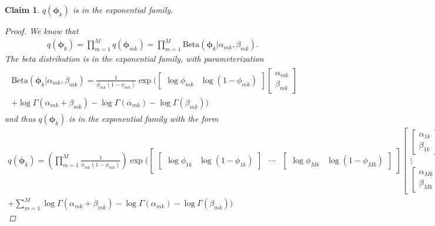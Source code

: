 \documentclass[11pt]{article}
\newtheorem{claim}{Claim}
\begin{document}
\begin{appendices}
\begin{claim}
$q(\bm{\phi}_k)$ is in the exponential family.
\begin{proof}
We know that
\begin{align*}
q(\bm{\phi}_k)  = \prod\limits_{m=1}^M q(\bm{\phi}_{mk}) = \prod\limits_{m=1}^M \mathrm{Beta}(\bm{\phi}_k | \alpha_{mk}, \beta_{mk}).
\end{align*}
The beta distribution is in the exponential family, with parameterization 
\begin{align}
\begin{split}
\mathrm{Beta}(\bm{\phi}_k |  \alpha_{mk}, \beta_{mk}) =  \frac{1}{\phi_{mk}(1 - \phi_{mk})} \exp \bigg(
		\begin{bmatrix}
			\log\phi_{mk} & \log(1 - \phi_{mk})
		\end{bmatrix}
		\begin{bmatrix}
			\alpha_{mk} \\ \beta_{mk}
		\end{bmatrix} \\
+ \log \Gamma(\alpha_{mk} + \beta_{mk}) - \log \Gamma(\alpha_{mk}) - \log\Gamma(\beta_{mk}) \bigg)
\end{split}
\end{align}
and thus $q(\bm{\phi}_k)$ is in the exponential family with the form
\begin{align*}
q(\bm{\phi}_k) = \left(\prod\limits_{m=1}^M \frac{1}{\phi_{mk}(1 - \phi_{mk})} \right) \exp\bigg(
			\begin{bmatrix}
				\begin{bmatrix}
				 \log\phi_{1k} & \log(1 - \phi_{1k} )
				\end{bmatrix} & \cdots &
				\begin{bmatrix}
				 \log\phi_{Mk} & \log(1 - \phi_{Mk})
				\end{bmatrix}
			\end{bmatrix}
			\begin{bmatrix}
				\begin{bmatrix}
				\alpha_{1k} \\ \beta_{1k} 
				\end{bmatrix} \\
				\vdots \\
				\begin{bmatrix}
				\alpha_{Mk} \\ \beta_{Mk}
				\end{bmatrix}
			\end{bmatrix} \\
			+ \sum\limits_{m=1}^M \log \Gamma(\alpha_{mk} + \beta_{mk}) - \log \Gamma(\alpha_{mk}) - \log\Gamma(\beta_{mk}) \bigg)

\end{align*}
\end{proof}
\end{claim}
\end{appendices}
\end{document}
